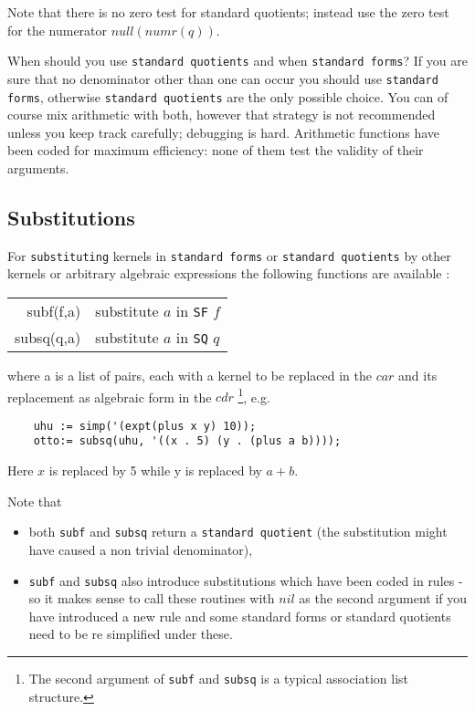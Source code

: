 \documentclass[11pt]{article}
\makeatletter
\newcommand{\ttindex}[1]{\index{#1@{\texttt{#1}}}}
\makeatother
\begin{document}
Note that there is no zero test for standard quotients; instead
use the zero test for the numerator $null(numr(q))$.

When should you use {\tt standard quotients} and when {\tt standard forms}?
If you are sure that no denominator other
than one can occur you should use {\tt standard forms}, otherwise
{\tt standard quotients} are the only possible choice. You can of course
mix arithmetic with both, however that strategy is 
not recommended unless you keep track carefully;  
debugging is hard. Arithmetic functions have been coded
for maximum efficiency: none of them test the validity of their
arguments.

\subsection{Substitutions}

For {\tt substituting}\ttindex{substituting} kernels in {\tt standard forms} 
or  {\tt standard quotients} 
by other kernels or arbitrary algebraic expressions the
following functions are available :
\begin{center}
\begin{tabular}{|r|l|} \hline 
    subf(f,a)& substitute $a$ in {\tt SF} $f$ \\
    subsq(q,a)& substitute $a$ in {\tt SQ} $q$ \\
\hline
\end{tabular}
\end{center}
where a is a list of pairs, each with a kernel to be replaced 
in the $car$ and its replacement as algebraic form in the $cdr$
\footnote{The second argument of {\tt subf} and {\tt subsq} 
is a typical association list structure.},
e.g.
\begin{verbatim}
    uhu := simp('(expt(plus x y) 10));
    otto:= subsq(uhu, '((x . 5) (y . (plus a b))));
\end{verbatim}
Here $x$ is replaced by 5 while y is replaced by $a+b$.

Note that
\begin{itemize}
\item both {\tt subf} and {\tt subsq} return a {\tt standard quotient}
(the substitution might have caused a non trivial denominator),
\item {\tt subf} and {\tt subsq} also introduce substitutions which have been
coded in rules - so it makes sense to call these routines with
$nil$ as the second argument if you have introduced a new rule and
some standard forms or standard quotients need to be re simplified
under these.
\end{itemize}
\end{document}
